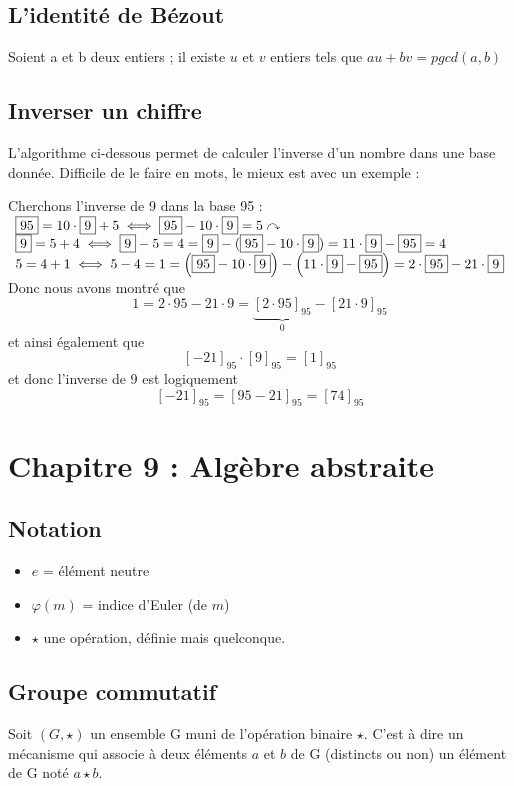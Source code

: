 \documentclass[11pt,a4paper]{article}
\renewcommand{\)}{\right)}
\renewcommand{\(}{\left(}
\begin{document}
\subsection{L'identité de Bézout}
Soient a et b deux entiers ; il existe $u$ et $v$ entiers tels que $au + bv = pgcd(a,b)$

\subsection{Inverser un chiffre}
L'algorithme ci-dessous permet de calculer l'inverse d'un nombre dans une base donnée. Difficile de le faire en mots, le mieux est avec un exemple :
\begin{exemple}
	Cherchons l'inverse de 9 dans la base 95 :\\
	$\begin{array}{l}
	\fbox{95} = 10\cdot \fbox{9} + 5 \iff \fbox{95} - 10\cdot\fbox{9} = 5 \curvearrowright \\
	\fbox{9} = 5 + 4   \iff \fbox{9} -5 = 4 = \fbox{9} - (\fbox{95} - 10\cdot\fbox{9}) = 11\cdot\fbox{9} - \fbox{95} = 4\\ 
	5 = 4 + 1 \iff 5 - 4 = 1 =\(\fbox{95}-10\cdot\fbox{9}\) - \(11\cdot\fbox{9}-\fbox{95}\) = 2\cdot\fbox{95}-21\cdot\fbox{9}
	\end{array}$\\
	Donc nous avons montré que \[1 = 2\cdot 95 - 21\cdot 9 = \underbrace{[2\cdot 95]_{95}}_0 - [21\cdot 9]_{95}\] et ainsi également que \[[-21]_{95}\cdot[9]_{95} = [1]_{95}\]
	et donc l'inverse de 9 est logiquement 
	\[[-21]_{95} = [95-21]_{95} = [74]_{95}\]
\end{exemple}
\section{Chapitre 9 : Algèbre abstraite}
\subsection{Notation}
\begin{itemize}
	\item $e$ = élément neutre
	\item $\varphi(m)$ = indice d'Euler (de $m$)
	\item $\star$ une opération, définie mais quelconque.
\end{itemize}

\subsection{Groupe commutatif}
Soit $(G,\star)$ un ensemble G muni de l'opération binaire $\star$. C'est à dire un mécanisme qui associe à deux éléments $a$ et $b$ de G (distincts ou non) un élément de G noté $a\star b$. 
\end{document}
